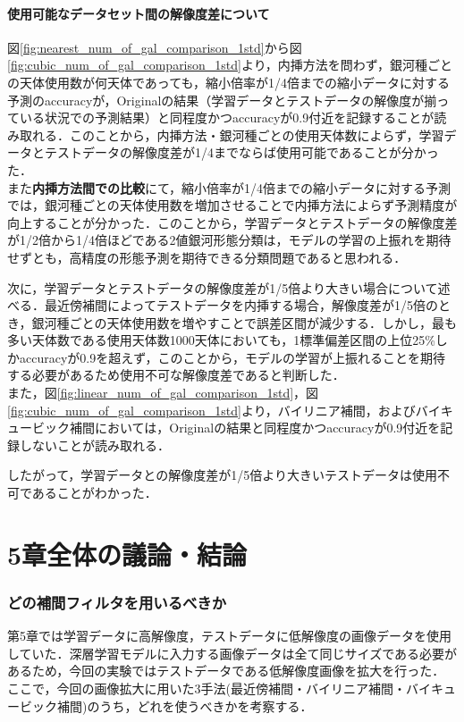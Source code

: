 \documentclass[a4j, 11pt]{jreport}
\begin{document}
\paragraph{使用可能なデータセット間の解像度差について}
図\ref{fig:nearest_num_of_gal_comparison_1std}から図\ref{fig:cubic_num_of_gal_comparison_1std}より，内挿方法を問わず，銀河種ごとの天体使用数が何天体であっても，縮小倍率が1/4倍までの縮小データに対する予測のaccuracyが，Originalの結果（学習データとテストデータの解像度が揃っている状況での予測結果）と同程度かつaccuracyが0.9付近を記録することが読み取れる．このことから，内挿方法・銀河種ごとの使用天体数によらず，学習データとテストデータの解像度差が1/4までならば使用可能であることが分かった．
\\また\textbf{内挿方法間での比較}にて，縮小倍率が1/4倍までの縮小データに対する予測では，銀河種ごとの天体使用数を増加させることで内挿方法によらず予測精度が向上することが分かった．このことから，学習データとテストデータの解像度差が1/2倍から1/4倍ほどである2値銀河形態分類は，モデルの学習の上振れを期待せずとも，高精度の形態予測を期待できる分類問題であると思われる．

次に，学習データとテストデータの解像度差が1/5倍より大きい場合について述べる．最近傍補間によってテストデータを内挿する場合，解像度差が1/5倍のとき，銀河種ごとの天体使用数を増やすことで誤差区間が減少する．しかし，最も多い天体数である使用天体数1000天体においても，1標準偏差区間の上位25\%しかaccuracyが0.9を超えず，このことから，モデルの学習が上振れることを期待する必要があるため使用不可な解像度差であると判断した．
\\また，図\ref{fig:linear_num_of_gal_comparison_1std}，図\ref{fig:cubic_num_of_gal_comparison_1std}より，バイリニア補間，およびバイキュービック補間においては，Originalの結果と同程度かつaccuracyが0.9付近を記録しないことが読み取れる．

したがって，学習データとの解像度差が1/5倍より大きいテストデータは使用不可であることがわかった．
\section{5章全体の議論・結論}
\subsubsection{どの補間フィルタを用いるべきか}
第5章では学習データに高解像度，テストデータに低解像度の画像データを使用していた．深層学習モデルに入力する画像データは全て同じサイズである必要があるため，今回の実験ではテストデータである低解像度画像を拡大を行った．\\ここで，今回の画像拡大に用いた3手法(最近傍補間・バイリニア補間・バイキュービック補間)のうち，どれを使うべきかを考察する．
\end{document}
